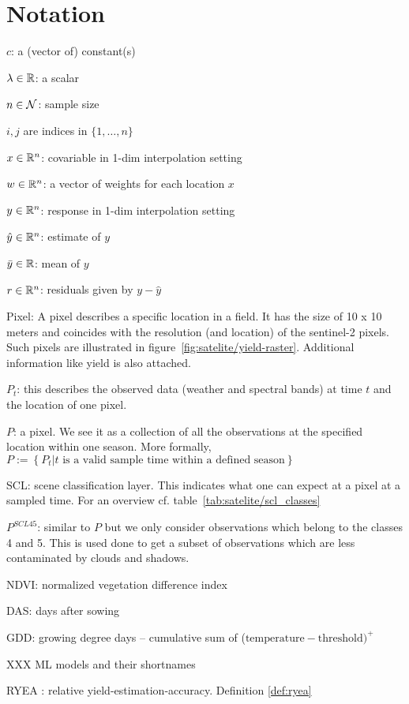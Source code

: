 \chapter*{Notation}
\label{c:Notation}

$c$: a (vector of) constant(s)

$\lambda \in \mathbb{R}$: a scalar

$n\in \operatorname{\mathcal{N}}$: sample size

$i,j$ are indices in $\{1,\dots,n\}$

$x\in \mathbb{R}^n$: covariable in 1-dim interpolation setting

$w \in \mathbb{R}^n$: a vector of weights for each location $x$

$y\in \mathbb{R}^n$: response in 1-dim interpolation setting

$\hat y\in \mathbb{R}^n$: estimate of $y$

$\bar y\in \mathbb{R}$: mean of $y$

$r \in \mathbb{R}^n$: residuals given by $y - \hat y$



Pixel: A pixel describes a specific location in a field. It has the size of 10 x 10 meters and coincides with the resolution (and location) of the sentinel-2 pixels. Such pixels are illustrated in figure~\ref{fig:satelite/yield-raster}. Additional information like yield is also attached.

$P_t$: this describes the observed data (weather and spectral bands) at time $t$ and the location of one pixel. 

$P$: a pixel. We see it as a collection of all the observations at the specified location within one season. More formally, $P := \left\{P_t | t\text{ is a valid sample time within a defined season}\right\}$

SCL: scene classification layer. This indicates what one can expect at a pixel at a sampled time. For an overview cf. table~\ref{tab:satelite/scl_classes}

$P^{SCL45}$: similar to $P$ but we only consider observations which belong to the classes 4 and 5. This is used done to get a subset of observations which are less contaminated by clouds and shadows.

NDVI: normalized vegetation difference index

DAS: days after sowing

GDD: growing degree days -- cumulative sum of ($\text{temperature}-\text{threshold})^+$

XXX ML models and their shortnames

RYEA : relative yield-estimation-accuracy. Definition \ref{def:ryea}
